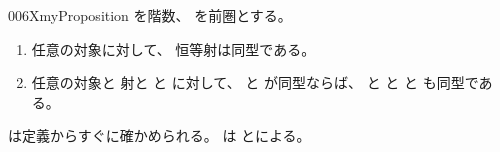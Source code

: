 \documentclass[index]{subfiles}
\begin{document}
\begin{myBlock}{006X}{myProposition}
  を階数、
  を前圏とする。
  \begin{enumerate}
  \item \label{006X:0000} 任意の対象に対して、
    恒等射は同型である。
  \item \label{006X:0001} 任意の対象と
    射と
    と
    に対して、
    と
    が同型ならば、
    と
    と
    と
    も同型である。
  \end{enumerate}
\end{myBlock}
\begin{myProof}
  は定義からすぐに確かめられる。
  は
  とによる。
\end{myProof}
\end{document}
